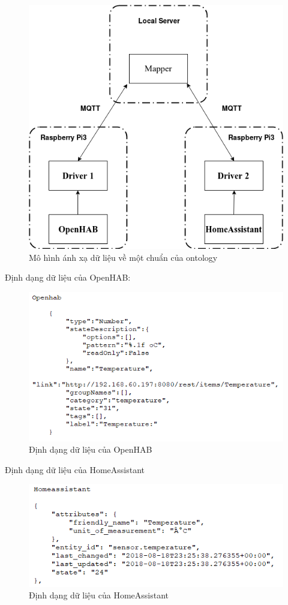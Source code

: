 \begin{figure}[h!]
	\center
	\includegraphics[scale=0.6]{image/mapping_service}
	\caption{Mô hình ánh xạ dữ liệu về một chuẩn của ontology}
\end{figure}

Định dạng dữ liệu của OpenHAB:
\begin{figure}[h!]
	\center
	\includegraphics[scale=0.6]{image/openhab_dataformat}
	\caption{Định dạng dữ liệu của OpenHAB}
\end{figure}
\clearpage

Định dạng dữ liệu của HomeAssistant
\begin{figure}[h!]
	\center
	\includegraphics[scale=0.6]{image/homeassistant_dataformat}
	\caption{Định dạng dữ liệu của HomeAssistant}
\end{figure}

